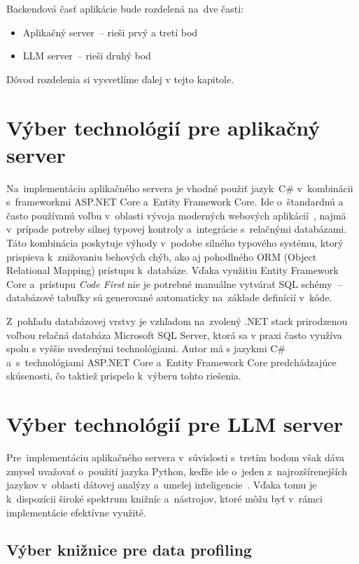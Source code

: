 Backendová časť aplikácie bude rozdelená na~dve časti:
\begin{itemize}
\item Aplikačný server~-- rieši prvý a tretí bod
\item LLM server~-- rieši druhý bod
\end{itemize}

Dôvod rozdelenia si vysvetlíme ďalej v tejto kapitole.

\section{Výber technológií pre aplikačný server}

Na~implementáciu aplikačného servera je vhodné použiť jazyk~C\# v~kombinácii s~frameworkmi ASP.NET Core a~Entity Framework Core. Ide o~štandardnú a často používanú voľbu v~oblasti vývoja moderných webových aplikácií~\cite{top-backend-languages}, najmä v~prípade potreby silnej typovej kontroly a~integrácie s~relačnými databázami. Táto kombinácia poskytuje výhody v~podobe silného typového systému, ktorý prispieva k~znižovaniu behových chýb, ako aj pohodlného ORM (Object Relational Mapping) prístupu k~databáze. Vďaka využitiu Entity Framework Core a~prístupu \textit{Code First} nie je potrebné manuálne vytvárať SQL schémy~-- databázové tabuľky sú generované automaticky na~základe definícií v~kóde.

Z~pohľadu databázovej vrstvy je vzhľadom na~zvolený .NET stack prirodzenou voľbou relačná databáza Microsoft SQL Server, ktorá sa v praxi často využíva spolu s vyššie uvedenými technológiami. Autor má s jazykmi C\# a~s~technológiami ASP.NET Core a~Entity Framework Core predchádzajúce skúsenosti, čo taktiež prispelo k~výberu tohto riešenia.

\section{Výber technológií pre LLM server}

Pre~implementáciu aplikačného servera v~súvislosti s~tretím bodom však dáva zmysel uvažovať o~použití jazyka Python, keďže ide o~jeden z~najrozšírenejších jazykov v~oblasti dátovej analýzy a~umelej inteligencie~\cite{top-data-science-languages}. Vďaka tomu je k~dispozícii široké spektrum knižníc a~nástrojov, ktoré môžu byť v~rámci implementácie efektívne využité.

\subsection{Výber knižnice pre data profiling}

